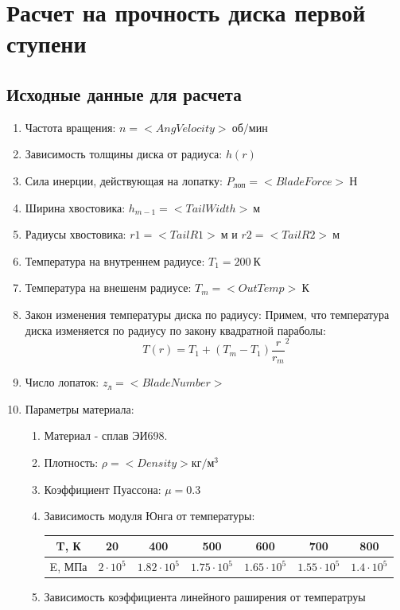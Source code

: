 \documentclass[a4paper,10pt]{article}
\begin{document}
\section{Расчет на прочность диска первой ступени}
\subsection{Исходные данные для расчета}
\begin{enumerate}
\item Частота вращения: $n = <AngVelocity>\ об/мин$
\item Зависимость толщины диска от радиуса: $h\left( r \right)$
\item Сила инерции, действующая на лопатку: $P_{лоп} = <BladeForce>\ Н$
\item Ширина хвостовика: $h_{m-1} = <TailWidth>\ м$
\item Радиусы хвостовика: $r1 = <TailR1>\ м$ и $r2 = <TailR2>\ м$
\item Температура на внутреннем радиусе: $T_1 = 200\ К$
\item Температура на внешенм радиусе: $T_m = <OutTemp>\ К$
\item Закон изменения температуры диска по радиусу: 
Примем, что температура диска изменяется по радиусу по закону квадратной параболы:
\[T\left( r \right) = T_1 + \left( T_m - T_1 \right) \frac{r}{r_m} ^2\]
\item Число лопаток: $z_{л} = <BladeNumber>$
\item Параметры материала:

\begin{enumerate}
	\item Материал - сплав ЭИ698.
	\item Плотность: $\rho = <Density> кг/м^3$
	\item Коэффициент Пуассона: $\mu = 0.3$
	\item Зависимость модуля Юнга от температуры:
	
	\begin{tabular}{|c|c|c|c|c|c|c|}
	\hline 
	T, К & 20 & 400 & 500 & 600 & 700 & 800 \\ 
	\hline 
	E, МПа & $2\cdot10^5$ & $1.82\cdot10^5$ & $1.75\cdot10^5$ & $1.65\cdot10^5$ & $1.55\cdot10^5$ & $1.4\cdot10^5$ \\ 
	\hline 
	\end{tabular} 
	
	\item Зависимость коэффициента линейного раширения от температруы
	

\end{enumerate}
\end{enumerate}
\end{document}
